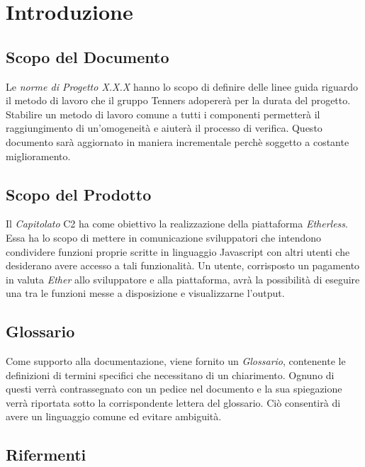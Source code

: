 \section{Introduzione}

\subsection{Scopo del Documento}
Le \textit{norme di Progetto X.X.X} hanno lo scopo di definire delle linee guida riguardo il metodo di lavoro che il gruppo Tenners adopererà per la durata del progetto. Stabilire un metodo di lavoro comune a tutti i componenti permetterà il raggiungimento di un'omogeneità e aiuterà il processo di verifica. Questo documento sar\`a aggiornato in maniera incrementale perchè soggetto a costante miglioramento.

\subsection{Scopo del Prodotto}
Il \textit{Capitolato\glo} C2 ha come obiettivo la realizzazione della piattaforma \textit{Etherless}. Essa ha lo scopo di mettere in comunicazione sviluppatori che intendono condividere funzioni proprie scritte in linguaggio Javascript con altri utenti che desiderano avere accesso a tali funzionalità. Un utente, corrisposto un pagamento in valuta \textit{Ether\glos} allo sviluppatore e alla piattaforma, avrà la possibilità di eseguire una tra le funzioni messe a disposizione e visualizzarne l'output. 


\subsection{Glossario}
Come supporto alla documentazione, viene fornito un \textit{Glossario}\docs,
contenente le definizioni di termini specifici che necessitano di un chiarimento.
Ognuno di questi verr\`a contrassegnato con un pedice \glo nel documento e la sua
spiegazione verr\`a riportata sotto la corrispondente lettera del glossario. Ci\`o
consentir\`a di avere un linguaggio comune ed evitare ambiguit\`a.

\subsection{Rifermenti}
